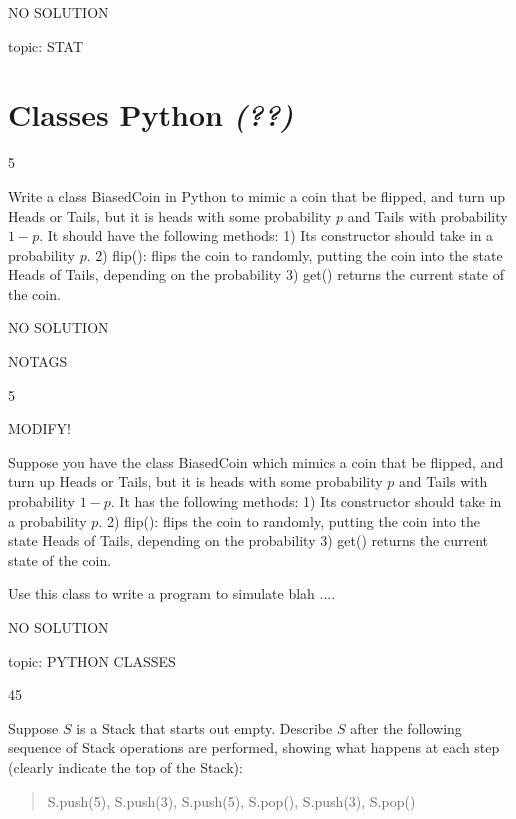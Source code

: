 \documentclass[12 pt]{article}
\newcommand{\topic}[1]{ {\bf \textit{(#1)}} }
\begin{document}
\begin{itemize}
{\begin{enumerate}
\end{enumerate}

} {
NO SOLUTION

} {}{topic: STAT} 






\section{Classes Python \topic{??}}

 
 
 
 \ex
{}{5}
{
Write a class BiasedCoin in Python to mimic a coin that be flipped, and turn up Heads or Tails, but it is heads with some probability $p$ and Tails with probability $1 - p$.  It should have the 
following methods:
1) Its constructor should take in a probability $p$.
2) flip(): flips the coin to randomly, putting the coin into the state Heads of Tails, depending on the probability
3) get() returns the current state of the coin.


} {
NO SOLUTION

} {}{NOTAGS} 
 
 
 \ex
{}{5}
{  
MODIFY!

Suppose you have the class BiasedCoin which mimics a coin that be flipped, and turn up Heads or Tails, but it is heads with some probability $p$ and Tails with probability $1 - p$.  It has the 
following methods:
1) Its constructor should take in a probability $p$.
2) flip(): flips the coin to randomly, putting the coin into the state Heads of Tails, depending on the probability
3) get() returns the current state of the coin.

Use this class to write a program to simulate blah ....


} {
NO SOLUTION

} {}{topic: PYTHON CLASSES} 






\ex
{}{45}
{
Suppose $S$ is a Stack that starts out empty.  Describe $S$ after the following sequence of Stack operations are performed, showing what happens at each step 
(clearly indicate the top of the Stack):
\begin{quote}
S.push(5),  S.push(3),  S.push(5), S.pop(), S.push(3), S.pop()
\end{quote}

}
\end{itemize}
\end{document}
